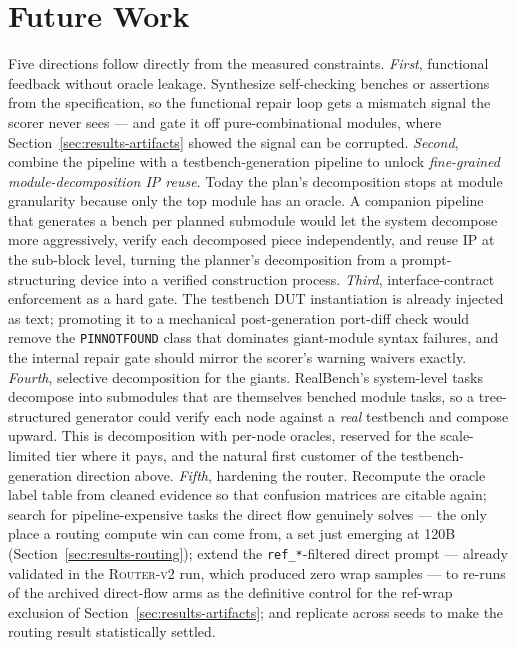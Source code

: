 \section{Future Work}
\label{sec:future}

Five directions follow directly from the measured constraints.
\emph{First}, functional feedback without oracle leakage. Synthesize
self-checking benches or assertions from the specification, so the
functional repair loop gets a mismatch signal the scorer never sees ---
and gate it off pure-combinational modules, where
Section~\ref{sec:results-artifacts} showed the signal can be corrupted.
\emph{Second}, combine the pipeline with a testbench-generation
pipeline to unlock \emph{fine-grained module-decomposition IP reuse}.
Today the plan's decomposition stops at module granularity because only
the top module has an oracle. A companion pipeline that generates a
bench per planned submodule would let the system decompose more
aggressively, verify each decomposed piece independently, and reuse IP
at the sub-block level, turning the planner's decomposition from a
prompt-structuring device into a verified construction process.
\emph{Third}, interface-contract enforcement as a hard gate. The
testbench DUT instantiation is already injected as text; promoting it to
a mechanical post-generation port-diff check would remove the
\texttt{PINNOTFOUND} class that dominates giant-module syntax failures,
and the internal repair gate should mirror the scorer's warning waivers
exactly. \emph{Fourth}, selective decomposition for the giants.
RealBench's system-level tasks decompose into submodules that are
themselves benched module tasks, so a tree-structured generator could
verify each node against a \emph{real} testbench and compose upward.
This is decomposition with per-node oracles, reserved for the
scale-limited tier where it pays, and the natural first customer of the
testbench-generation direction above. \emph{Fifth}, hardening the
router. Recompute the oracle label table from cleaned evidence so
that confusion matrices are citable again; search for
pipeline-expensive tasks the direct flow genuinely solves --- the only
place a routing compute win can come from, a set just emerging at 120B
(Section~\ref{sec:results-routing}); extend the
\texttt{ref\_*}-filtered direct prompt --- already validated in the
\textsc{Router-v2} run, which produced zero wrap samples --- to
re-runs of the archived direct-flow arms as the definitive control for
the ref-wrap exclusion of Section~\ref{sec:results-artifacts}; and
replicate across seeds to make the routing result statistically
settled.

